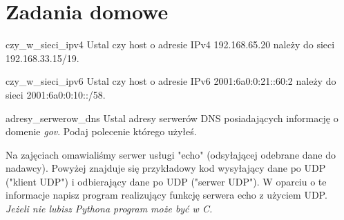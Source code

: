 \documentclass{pdfBooklets}
\begin{document}
\student{\clearpage}
\section{Zadania domowe}

\begin{Zadanie}{}{czy_w_sieci_ipv4} %
Ustal czy host o adresie IPv4 192.168.65.20 należy do sieci 192.168.33.15/19.
\end{Zadanie}


\begin{Zadanie}{}{czy_w_sieci_ipv6} %
Ustal czy host o adresie IPv6 2001:6a0:0:21::60:2 należy do sieci 2001:6a0:0:10::/58.
\end{Zadanie}


\begin{Zadanie}{}{adresy_serwerow_dns} %
Ustal adresy serwerów DNS posiadających informację o domenie \emph{gov}. Podaj polecenie którego użyłeś.
\end{Zadanie}



\begin{Zadanie}{}{} %
Na zajęciach omawialiśmy serwer usługi "echo" (odsyłającej odebrane dane do nadawcy).
Powyżej znajduje się przykładowy kod wysyłający dane po UDP ("klient UDP") i odbierający dane po UDP ("serwer UDP").
W oparciu o te informacje napisz program realizujący funkcję serwera echo z użyciem UDP.\\
\emph{Jeżeli nie lubisz Pythona program może być w C.}
\end{Zadanie}
\end{document}
